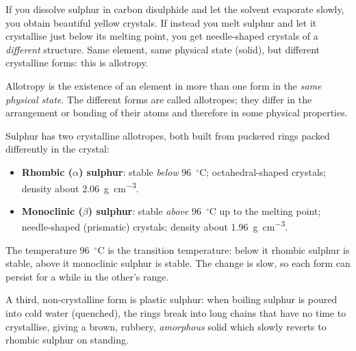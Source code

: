 \documentclass[11pt]{article}
\newcommand{\cle}[1]{{\popxbold\color{popdark}#1}}
\newcounter{popsec}
\newcounter{popsub}
\newcommand{\courssub}[1]{%
  \stepcounter{popsub}%
  \par\vspace{9pt}\noindent{\popxbold\fontsize{11.5}{13}\selectfont\color{popink}{\color{poporange}\thepopsec.\thepopsub}\hspace{6pt}#1}\par\nopagebreak\vspace{4pt}
}
\begin{document}
\courssub{Allotropes of Sulphur}

If you dissolve sulphur in carbon disulphide and let the solvent evaporate slowly, you obtain beautiful yellow crystals. If instead you melt sulphur and let it crystallise just below its melting point, you get needle-shaped crystals of a \emph{different} structure. Same element, same physical state (solid), but different crystalline forms: this is allotropy.

\begin{definition}[Allotropy]
\cle{Allotropy} is the existence of an element in more than one form in the \emph{same physical state}. The different forms are called \cle{allotropes}; they differ in the arrangement or bonding of their atoms and therefore in some physical properties.
\end{definition}

Sulphur has two crystalline allotropes, both built from puckered  rings packed differently in the crystal:

\begin{itemize}
\item \textbf{Rhombic ($\alpha$) sulphur}: stable \emph{below} \SI{96}{\ensuremath{{}^{\circ}\mathrm{C}}}; octahedral-shaped crystals; density about \SI{2.06}{g.cm^{-3}}.
\item \textbf{Monoclinic ($\beta$) sulphur}: stable \emph{above} \SI{96}{\ensuremath{{}^{\circ}\mathrm{C}}} up to the melting point; needle-shaped (prismatic) crystals; density about \SI{1.96}{g.cm^{-3}}.
\end{itemize}

The temperature \SI{96}{\ensuremath{{}^{\circ}\mathrm{C}}} is the \cle{transition temperature}: below it rhombic sulphur is stable, above it monoclinic sulphur is stable. The change is slow, so each form can persist for a while in the other's range.

A third, non-crystalline form is \cle{plastic sulphur}: when boiling sulphur is poured into cold water (quenched), the  rings break into long chains that have no time to crystallise, giving a brown, rubbery, \emph{amorphous} solid which slowly reverts to rhombic sulphur on standing.
\end{document}
